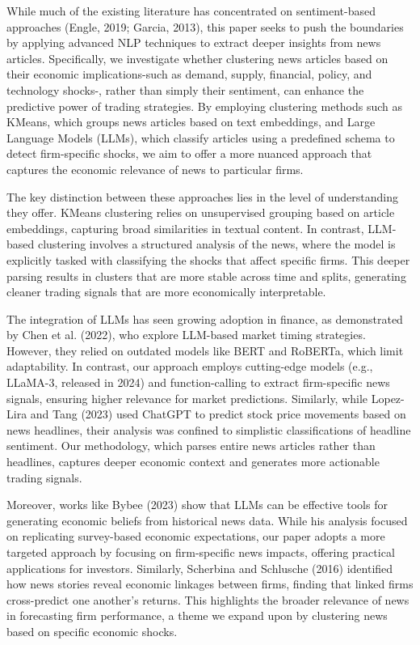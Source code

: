 While much of the existing literature has concentrated on sentiment-based approaches (Engle, 2019; Garcia, 2013), this paper seeks to push the boundaries by applying advanced NLP techniques to extract deeper insights from news articles. Specifically, we investigate whether clustering news articles based on their economic implications-such as demand, supply, financial, policy, and technology shocks-, rather than simply their sentiment, can enhance the predictive power of trading strategies. By employing clustering methods such as KMeans, which groups news articles based on text embeddings, and Large Language Models (LLMs), which classify articles using a predefined schema to detect firm-specific shocks, we aim to offer a more nuanced approach that captures the economic relevance of news to particular firms.

The key distinction between these approaches lies in the level of understanding they offer. KMeans clustering relies on unsupervised grouping based on article embeddings, capturing broad similarities in textual content. In contrast, LLM-based clustering involves a structured analysis of the news, where the model is explicitly tasked with classifying the shocks that affect specific firms. This deeper parsing results in clusters that are more stable across time and splits, generating cleaner trading signals that are more economically interpretable.

The integration of LLMs has seen growing adoption in finance, as demonstrated by Chen et al. (2022), who explore LLM-based market timing strategies. However, they relied on outdated models like BERT and RoBERTa, which limit adaptability. In contrast, our approach employs cutting-edge models (e.g., LLaMA-3, released in 2024) and function-calling to extract firm-specific news signals, ensuring higher relevance for market predictions. Similarly, while Lopez-Lira and Tang (2023) used ChatGPT to predict stock price movements based on news headlines, their analysis was confined to simplistic classifications of headline sentiment. Our methodology, which parses entire news articles rather than headlines, captures deeper economic context and generates more actionable trading signals. 

Moreover, works like Bybee (2023) show that LLMs can be effective tools for generating economic beliefs from historical news data. While his analysis focused on replicating survey-based economic expectations, our paper adopts a more targeted approach by focusing on firm-specific news impacts, offering practical applications for investors. Similarly, Scherbina and Schlusche (2016) identified how news stories reveal economic linkages between firms, finding that linked firms cross-predict one another's returns. This highlights the broader relevance of news in forecasting firm performance, a theme we expand upon by clustering news based on specific economic shocks.

